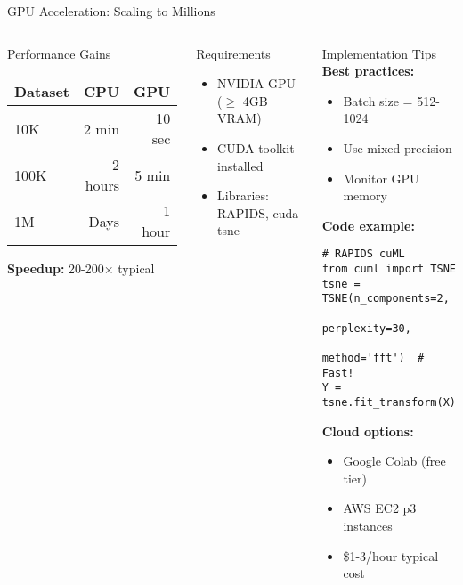 \documentclass[aspectratio=169]{beamer}
\begin{document}
\begin{frame}[fragile]{GPU Acceleration: Scaling to Millions}
\begin{columns}
\begin{block}{Performance Gains}
\begin{center}
\begin{tabular}{l|r|r}
\textbf{Dataset} & \textbf{CPU} & \textbf{GPU} \\
\hline
10K & 2 min & 10 sec \\
100K & 2 hours & 5 min \\
1M & Days & 1 hour \\
\end{tabular}
\end{center}

\vspace{3mm}
\textbf{Speedup:} 20-200× typical
\end{block}

\vspace{3mm}
\begin{block}{Requirements}
\begin{itemize}
\item NVIDIA GPU ($\geq$ 4GB VRAM)
\item CUDA toolkit installed
\item Libraries: RAPIDS, cuda-tsne
\end{itemize}
\end{block}

\begin{block}{Implementation Tips}
\textbf{Best practices:}
\begin{itemize}
\item Batch size = 512-1024
\item Use mixed precision
\item Monitor GPU memory
\end{itemize}

\textbf{Code example:}
\footnotesize
\begin{verbatim}
# RAPIDS cuML
from cuml import TSNE
tsne = TSNE(n_components=2,
            perplexity=30,
            method='fft')  # Fast!
Y = tsne.fit_transform(X)
\end{verbatim}
\normalsize

\textbf{Cloud options:}
\begin{itemize}
\item Google Colab (free tier)
\item AWS EC2 p3 instances
\item \$1-3/hour typical cost
\end{itemize}
\end{block}
\end{columns}
\end{frame}
\end{document}
